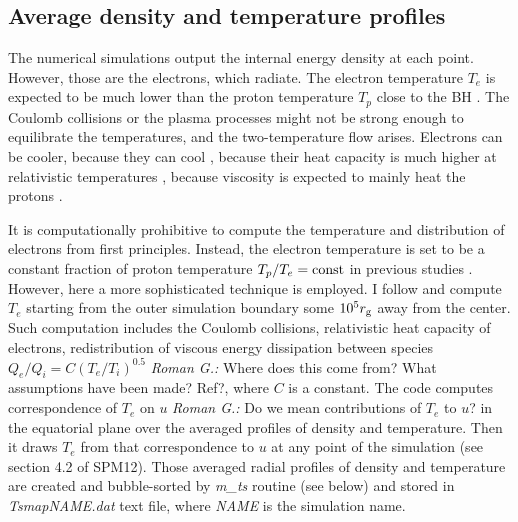 \documentclass{emulateapj}
\newcommand{\rg}[1]{\color{blue}\textit{Roman G.:} #1\color{black}}
\begin{document}
\subsection{Average density and temperature profiles}
The numerical simulations output the internal energy density at each
point. However, those are the electrons, which radiate.  The electron
temperature $T_e$ is expected to be much lower than the proton
temperature $T_p$ close to the BH \citep{Narayan:1995kj}.  The Coulomb
collisions or the plasma processes might not be strong enough to
equilibrate the temperatures, and the two-temperature flow arises.
Electrons can be cooler, because they can cool
\citep{Drappeau:2012dq}, because their heat capacity is much higher at
relativistic temperatures \citep{Shcherbakov:2010cond}, because
viscosity is expected to mainly heat the protons
\citep{Narayan:1995kj,Sharma_heating:2007}.

It is computationally prohibitive to compute the temperature and
distribution of electrons from first principles. Instead, the electron
temperature is set to be a constant fraction of proton temperature
$T_p/T_e=\rm const$ in previous studies
\citep{Moscibrodzka:2009,Dexter:2010lk}.  However, here a more
sophisticated technique is employed. I follow
\citet{Sharma_heating:2007} and compute $T_e$ starting from the outer
simulation boundary some $10^5r_{\rm g}$ away from the center. Such
computation includes the Coulomb collisions, relativistic heat
capacity of electrons, redistribution of viscous energy dissipation
between species $Q_e/Q_i=C(T_e/T_i)^{0.5}$ \rg{Where does this come
  from? What assumptions have been made? Ref?}, where $C$ is a
constant.  The code computes correspondence of $T_e$ on $u$ \rg{Do we
  mean contributions of $T_e$ to $u$?} in the equatorial plane over
the averaged profiles of density and temperature.  Then it draws $T_e$
from that correspondence to $u$ at any point of the simulation (see
section 4.2 of SPM12).  Those averaged radial profiles of density and
temperature are created and bubble-sorted by \textit{m\_ts} routine
(see below) and stored in \textit{TsmapNAME.dat} text file, where
\textit{NAME} is the simulation name.
\end{document}
